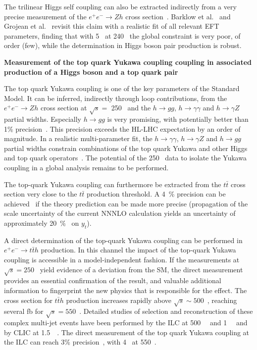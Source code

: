 
The trilinear Higgs self coupling can also be extracted indirectly from a very precise
measurement of the $e^+ e^- \rightarrow Zh$ cross section~\cite{McCullough:2013rea}. Barklow et al.~\cite{Barklow:2017awn}
and Grojean et al.~\cite{DiVita:2017vrr} revisit this claim with a realistic fit of
all relevant EFT parameters, finding that with 5~\iab{} at 240~\GeV
the global constraint is very poor, of order (few), while the determination in Higgs boson pair production is robust. 

{\bf Measurement of the top quark Yukawa coupling coupling in associated production of a Higgs boson and a top quark pair}

The top quark Yukawa coupling is one of the key parameters of the Standard Model. 
It can be inferred, indirectly through loop contributions, from the $e^+e^- \rightarrow Zh$
cross section at $\sqrt{s}= $ 250~\GeV{} and the $h \rightarrow gg$, $h \rightarrow \gamma \gamma$
and $h \rightarrow \gamma Z$ partial widths. Especially $h \rightarrow gg$ is very promising, with potentially
better than 1\% precision~\cite{Boselli:2018zxr}. This precision exceeds the HL-LHC expectation by an order of magnitude.
In a realistic multi-parameter fit, the $h \rightarrow \gamma \gamma$, $h \rightarrow \gamma Z$ and $h \rightarrow gg$
partial widths constrain combinations of the top quark Yukawa and other Higgs~\cite{Azatov:2016xik} and top quark
operators~\cite{Vryonidou:2018eyv}. The potential of the 250~\GeV{} data to isolate the Yukawa
coupling in a global analysis remains to be performed.

The top-quark Yukawa coupling can furthermore be extracted from the $t\bar{t}$
cross section very close to the $t\bar{t}$ production threshold. A 4~\% precision can be achieved~\cite{Horiguchi:2013wra}
if the theory prediction can be made more precise (propagation of the scale uncertainty of the current NNNLO calculation yields
an uncertainty of approximately 20~\%~\cite{Vos:2016til} on $y_t$).

A direct determination of the top-quark Yukawa coupling can be performed in $e^+e^- \rightarrow t\bar{t}h$ production.
In this channel the impact of the top-quark Yukawa coupling is accessible in a model-independent fashion. If the
measurements at $\sqrt{s}=250$~\GeV{} yield evidence of a deviation from the SM, the direct measurement provides
an essential confirmation of the result, and valuable additional information to fingerprint the new physics that
is responsible for the effect. The cross section for $t\bar{t}h$ production increases rapidly above $\sqrt{s} \sim 500 $~\GeV{},
reaching several fb for $\sqrt{s} = 550$~\GeV. Detailed studies of selection and reconstruction of these complex multi-jet events
have been performed by the ILC at 500~\GeV~\cite{Yonamine:2011jg} and 1~\TeV~\cite{Price:2014oca} and by CLIC
at 1.5~\TeV~\cite{Abramowicz:2018rjq}. The direct measurement of the top quark Yukawa coupling at the ILC can reach 3\%
precision~\cite{Fujii:2015jha}, with 4~\iab{} at 550~\GeV.




